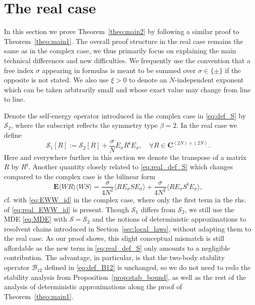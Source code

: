 \documentclass[10pt]{amsart}
\numberwithin{equation}{section}
\newcommand{\E}{\mathbf{E}}
\newcommand{\C}{\mathbf{C}}
\begin{document}
\section{The real case}
\label{sec:real}

In this section we prove Theorem~\ref{theo:main2} by following a similar proof to Theorem~\ref{theo:main1}. The overall  proof structure in the real case remains the same as in the complex case, we thus primarily focus on explaining the main  technical differences and new difficulties. We frequently use the convention that a free index $\sigma$ appearing in formulas is meant to be summed over $\sigma\in\{\pm\}$ if the opposite is not stated. We also use $\xi>0$ to denote an $N$-independent exponent which can be taken arbitrarily small and whose exact value may change from line to line. 

Denote the self-energy operator introduced in the complex case in \eqref{eq:def_S} by $\mathcal{S}_2$, where the subscript reflects the symmetry type $\beta=2$. In the real case we define
\begin{equation}
\mathcal{S}_1[R] := \mathcal{S}_2[R] +\frac{\sigma}{N}E_\sigma R^\mathfrak{t}E_\sigma,\quad \forall R\in\C^{(2N)\times (2N)}.
\label{eq:real_def_S}
\end{equation}
Here and everywhere further in this section we denote the transpose of a matrix $R$ by $R^\mathfrak{t}$. Another quantity closely related to \eqref{eq:real_def_S} which changes compared to the complex case is the bilinear form
\begin{equation}
\E \langle WR\rangle \langle WS\rangle = \frac{\sigma}{4N^2}\langle RE_\sigma SE_\sigma \rangle + \frac{\sigma}{4N^2}\langle RE_\sigma S^\mathfrak{t}E_\sigma \rangle,
\label{eq:real_EWW_id}
\end{equation}
cf. with \eqref{eq:EWW_id} in the complex case, where only the first term in the rhs. of \eqref{eq:real_EWW_id} is present. Though $\mathcal{S}_1$ differs from $\mathcal{S}_2$, we still use the MDE \eqref{eq:MDE} with $\mathcal{S} = \mathcal{S}_2$ and the notions of deterministic approximations to resolvent chains introduced in Section~\ref{sec:local_laws}, without adapting them to the real case. As our proof shows, this slight conceptual mismatch is still affordable as the new term in \eqref{eq:real_def_S} only amounts to a negligible contribution. The advantage, in particular, is that the two-body stability operator $\mathcal{B}_{12}$ defined in \eqref{eq:def_B12} is unchanged, so we do not need to redo the stability analysis from Proposition~\ref{prop:stab_bound}, as well as the rest of the analysis of deterministic approximations along the proof of Theorem~\ref{theo:main1}.
\end{document}
